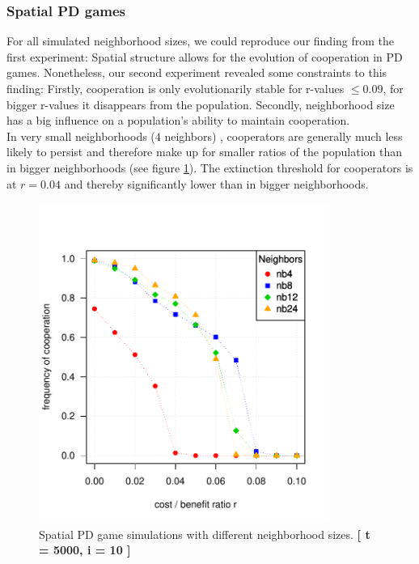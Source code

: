 \subsubsection*{Spatial PD games}
For all simulated neighborhood sizes, we could reproduce our finding from the first experiment: Spatial structure allows for the evolution of cooperation in PD games. Nonetheless, our second experiment revealed some constraints to this finding: Firstly, cooperation is only evolutionarily stable for r-values $ \leq 0.09$, for bigger r-values it disappears from the population. Secondly, neighborhood size has a big influence on a population's ability to maintain cooperation.\\
In very small neighborhoods ($4$ neighbors) , cooperators are generally much less likely to persist and therefore make up for smaller ratios of the population than in bigger neighborhoods (see figure \ref{fig: task2_multiplot}). The extinction threshold for cooperators is at $r=0.04$ and thereby significantly lower than in bigger neighborhoods. 

\begin{figure}[H]
	\centering 
	\includegraphics[width=9.5cm]{task2_multiplot}
	\caption{Spatial PD game simulations with different neighborhood sizes.  \textbf{[ t = 5000, i = 10 ]} }\label{fig: task2_multiplot}
\end{figure}
 
